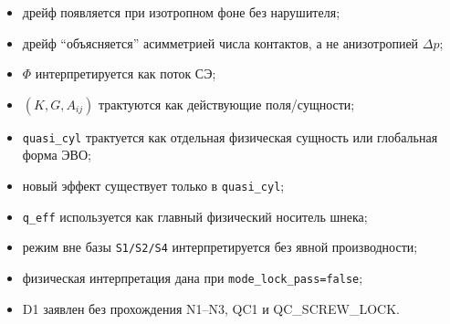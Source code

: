 \begin{itemize}
\item дрейф появляется при изотропном фоне без нарушителя;
\item дрейф ``объясняется'' асимметрией числа контактов, а не анизотропией $\Delta p$;
\item $\Phi$ интерпретируется как поток СЭ;
\item $(K,G,A_{ij})$ трактуются как действующие поля/сущности;
\item \texttt{quasi\_cyl} трактуется как отдельная физическая сущность или глобальная форма ЭВО;
\item новый эффект существует только в \texttt{quasi\_cyl};
\item \texttt{q\_eff} используется как главный физический носитель шнека;
\item режим вне базы \texttt{S1/S2/S4} интерпретируется без явной производности;
\item физическая интерпретация дана при \texttt{mode\_lock\_pass=false};
\item D1 заявлен без прохождения N1--N3, QC1 и QC\_SCREW\_LOCK.
\end{itemize}
